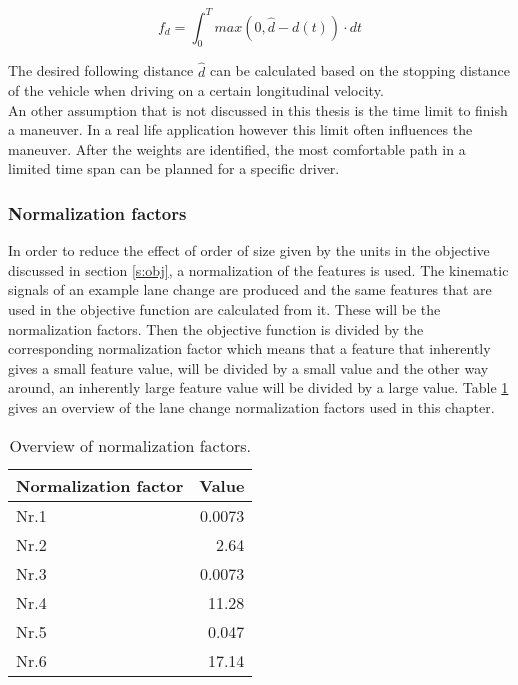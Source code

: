\begin{equation}\label{eq:lane_d}
f_d= \int_{0}^{T} max(0,\hat{d}-d(t))\cdot dt
\end{equation}


The desired following distance $\hat{d}$ can be calculated based on the stopping distance of the vehicle when driving on a certain longitudinal velocity. \\

An other assumption that is not discussed in this thesis is the time limit to finish a maneuver. In a real life application however this limit often influences the maneuver. After the weights are identified, the most comfortable path in a limited time span can be planned for a specific driver. 

\subsubsection{Normalization factors} \label{s:norm}
In order to reduce the effect of order of size given by the units in the objective discussed in section \ref{s:obj}, a normalization of the features is used. The kinematic signals of an example lane change are produced and the same features that are used in the objective function are calculated from it. These will be the normalization factors. Then the objective function is divided by the corresponding normalization factor which means that a feature that inherently gives a small feature value, will be divided by a small value and the other way around, an inherently large feature value will be divided by a large value. Table \ref{table:norm} gives an overview of the lane change normalization factors used in this chapter. 


\begin{table}[h!]\label{table:norm}
  \centering
  \begin{tabular}{@{}lr@{}} 
    Normalization factor    & Value\\ \midrule
    Nr.1      & 0.0073\\
    Nr.2          & 2.64\\
    Nr.3 	   & 0.0073\\
    Nr.4       & 11.28\\
    Nr.5       & 0.047\\
    Nr.6  & 17.14\\ \bottomrule
  \end{tabular}
  \caption{Overview of  normalization factors.}
\end{table}


